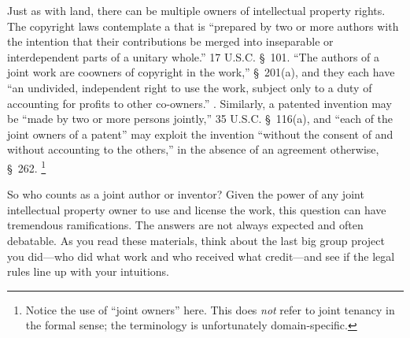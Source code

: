 
Just as with land, there can be multiple owners of intellectual property
rights. The copyright laws contemplate a  that is ``prepared by
two or more authors with the intention that their contributions be merged into
inseparable or interdependent parts of a unitary whole.'' 17 U.S.C. \S~101.
``The authors of a joint work are coowners of copyright in the work,''
\S~201(a), and they each have ``an undivided, independent right to use the work,
subject only to a duty of accounting for profits to other co-owners.''
. Similarly, a
patented invention may be ``made by two or more persons jointly,'' 35 U.S.C.
\S~116(a), and ``each of the joint owners of a patent'' may exploit the
invention ``without the consent of and without accounting to the others,'' in
the absence of an agreement otherwise, \S~262. \footnote{Notice the use of
``joint owners'' here. This does \emph{not} refer to joint tenancy in the
formal sense; the terminology is unfortunately domain-specific.}

So who counts as a joint author or inventor? Given the power of any joint
intellectual property owner to use and license the work, this question can have
tremendous ramifications. The answers are not always expected and often
debatable. As you read these materials, think about the last big group project
you did---who did what work and who received what credit---and see if the legal
rules line up with your intuitions.




